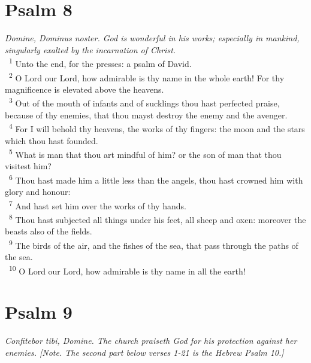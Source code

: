 \documentclass[a5paper,12pt]{article}
\begin{document}
\begin{multicols*}{2}
\section{Psalm 8}
\label{sec:org3289e17}
\emph{Domine, Dominus noster. God is wonderful in his works; especially in mankind, singularly exalted by the incarnation of Christ.}\\

~\textsuperscript{1} Unto the end, for the presses: a psalm of David.\\
~\textsuperscript{2} O Lord our Lord, how admirable is thy name in the whole earth! For thy magnificence is elevated above the heavens.\\
~\textsuperscript{3} Out of the mouth of infants and of sucklings thou hast perfected praise, because of thy enemies, that thou mayst destroy the enemy and the avenger.\\
~\textsuperscript{4} For I will behold thy heavens, the works of thy fingers: the moon and the stars which thou hast founded.\\
~\textsuperscript{5} What is man that thou art mindful of him? or the son of man that thou visitest him?\\
~\textsuperscript{6} Thou hast made him a little less than the angels, thou hast crowned him with glory and honour:\\
~\textsuperscript{7} And hast set him over the works of thy hands.\\
~\textsuperscript{8} Thou hast subjected all things under his feet, all sheep and oxen: moreover the beasts also of the fields.\\
~\textsuperscript{9} The birds of the air, and the fishes of the sea, that pass through the paths of the sea.\\
~\textsuperscript{10} O Lord our Lord, how admirable is thy name in all the earth!\\

\section{Psalm 9}
\label{sec:org8537124}
\emph{Confitebor tibi, Domine. The church praiseth God for his protection against her enemies. [Note. The second part below verses 1-21 is the Hebrew Psalm 10.]}\\


\end{multicols*}
\end{document}
